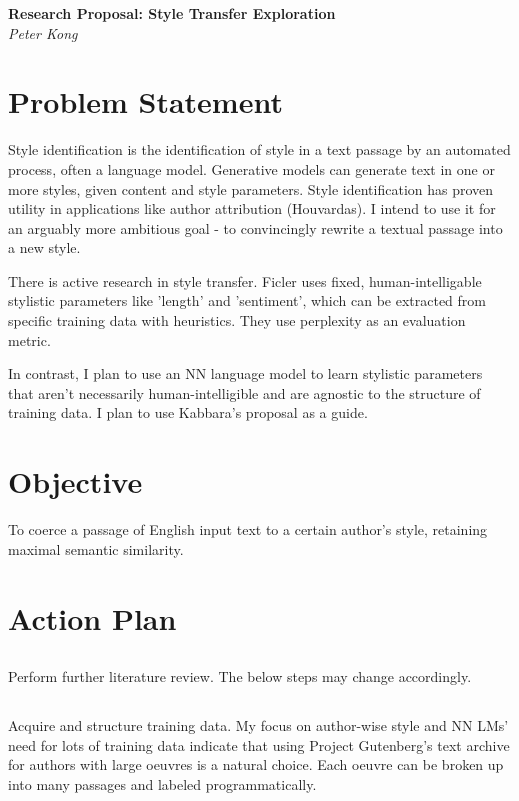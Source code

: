 \documentclass[11pt]{article}
\begin{document}
\begin{center}
	\vspace{1em}
  \LARGE\textbf{Research Proposal: Style Transfer Exploration}\\
  \large\textit{Peter Kong}
\end{center}

\section{Problem Statement}
Style identification is the identification of style in a text passage by an automated process, often a language model. Generative models can generate text in one or more styles, given content and style parameters. Style identification has proven utility in applications like author attribution (Houvardas). I intend to use it for an arguably more ambitious goal - to convincingly rewrite a textual passage into a new style.

There is active research in style transfer. Ficler uses fixed, human-intelligable stylistic parameters like 'length' and 'sentiment', which can be extracted from specific training data with heuristics. They use perplexity as an evaluation metric.   

In contrast, I plan to use an NN language model to learn stylistic parameters that aren't necessarily human-intelligible and are agnostic to the structure of training data. I plan to use Kabbara's proposal as a guide.

\section{Objective}
To coerce a passage of English input text to a certain author's style, retaining maximal semantic similarity.


\section{Action Plan}
\subsection{}
Perform further literature review. The below steps may change accordingly.

\subsection{}
Acquire and structure training data. My focus on author-wise style and NN LMs' need for lots of training data indicate that using Project Gutenberg's text archive for authors with large oeuvres is a natural choice. Each oeuvre can be broken up into many passages and labeled programmatically.
\end{document}
